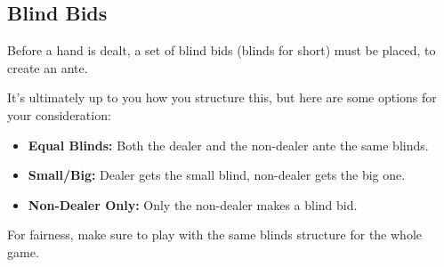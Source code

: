 \subsection{Blind Bids}
Before a hand is dealt, a set of blind bids (blinds for short) must be placed, to create an ante.

It's ultimately up to you how you structure this, but here are some options for your consideration:
\begin{itemize}
    \item \textbf{Equal Blinds:} Both the dealer and the non-dealer ante the same blinds.
    \item \textbf{Small/Big:} Dealer gets the small blind, non-dealer gets the big one.
    \item \textbf{Non-Dealer Only:} Only the non-dealer makes a blind bid.
\end{itemize}
For fairness, make sure to play with the same blinds structure for the whole game.